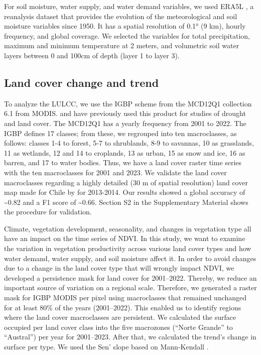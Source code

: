 \documentclass[
  authoryear,
  preprint,
  3p,
  onecolumn]{elsarticle}
\begin{document}
For soil moisture, water supply, and water demand variables, we used
ERA5L \citep{MunozSabater2021}, a reanalysis dataset that provides the
evolution of the meteorological and soil moisture variables since 1950.
It has a spatial resolution of 0.1° (9 km), hourly frequency, and global
coverage. We selected the variables for total precipitation, maximum and
minimum temperature at 2 meters, and volumetric soil water layers
between 0 and 100cm of depth (layer 1 to layer 3).

\hypertarget{land-cover-change-and-trend}{%
\subsection{Land cover change and
trend}\label{land-cover-change-and-trend}}

To analyze the LULCC, we use the IGBP scheme from the MCD12Q1 collection
6.1 from MODIS. \citet{Zambrano2018} and \citet{Fuentes2021} have
previously used this product for studies of drought and land cover. The
MCD12Q1 has a yearly frequency from 2001 to 2022. The IGBP defines 17
classes; from these, we regrouped into ten macroclasses, as follows:
classes 1-4 to forest, 5-7 to shrublands, 8-9 to savannas, 10 as
grasslands, 11 as wetlands, 12 and 14 to croplands, 13 as urban, 15 as
snow and ice, 16 as barren, and 17 to water bodies. Thus, we have a land
cover raster time series with the ten macroclasses for 2001 and 2023. We
validate the land cover macroclasses regarding a highly detailed (30 m
of spatial resolution) land cover map made for Chile by \citet{Zhao2016}
for 2013-2014. Our results showed a global accuracy of
\textasciitilde0.82 and a F1 score of \textasciitilde0.66. Section S2 in
the Supplementary Material shows the procedure for validation.

Climate, vegetation development, seasonality, and changes in vegetation
type all have an impact on the time series of NDVI. In this study, we
want to examine the variation in vegetation productivity across various
land cover types and how water demand, water supply, and soil moisture
affect it. In order to avoid changes due to a change in the land cover
type that will wrongly impact NDVI, we developed a persistence mask for
land cover for 2001--2022. Thereby, we reduce an important source of
variation on a regional scale. Therefore, we generated a raster mask for
IGBP MODIS per pixel using macroclasses that remained unchanged for at
least 80\% of the years (2001--2022). This enabled us to identify
regions where the land cover macroclasses are persistent. We calculated
the surface occupied per land cover class into the five macrozones
(``Norte Grande'' to ``Austral'') per year for 2001--2023. After that,
we calculated the trend's change in surface per type. We used the Sen'
slope \citep{Sen1968} based on Mann-Kendall \citep{Kendall1975}.
\end{document}
